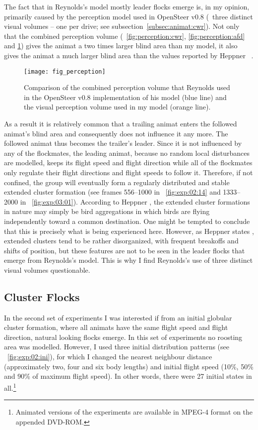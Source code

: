 The fact that in Reynolds's model mostly leader flocks emerge is, in my opinion, primarily caused by the perception model used in OpenSteer v0.8 (\ie\ three distinct visual volumes -- one per drive; see subsection~\ref{subsec:animat:cwr}). Not only that the combined perception volume (\figs~\ref{fig:perception:cwr}, \ref{fig:perception:afd} and \ref{fig:perception}) gives the animat a two times larger blind area than my model, it also gives the animat a much larger blind area than the values reported by Heppner \etal\ \cite{heppner:1985}.
%
\begin{figure}
  \texttt{[image: fig\_perception]}
  \caption{Comparison of the combined perception volume that Reynolds used in the OpenSteer v0.8 implementation of his model \cite{reynolds:1999} (blue line) and the visual perception volume used in my model (orange line).}
  \label{fig:perception}
\end{figure}
%
As a result it is relatively common that a trailing animat enters the followed animat's blind area and consequently does not influence it any more. The followed animat thus becomes the trailer's leader. Since it is not influenced by any of the flockmates, the leading animat, because no random local disturbances are modelled, keeps its flight speed and flight direction while all of the flockmates only regulate their flight directions and flight speeds to follow it. Therefore, if not confined, the group will eventually form a regularly distributed and stable extended cluster formation (see frames 556--1000 in \fig~\ref{fig:exp:02:14} and 1333--2000 in \fig~\ref{fig:exp:03:01}). According to Heppner \cite{heppner:1974a}, the extended cluster formations in nature may simply be bird aggregations in which birds are flying independently toward a common destination. One might be tempted to conclude that this is precisely what is being experienced here. However, as Heppner states \cite{heppner:1974a}, extended clusters tend to be rather disorganized, with frequent breakoffs and shifts of position, but these features are not to be seen in the leader flocks that emerge from Reynolds's model. This is why I find Reynolds's use of three distinct visual volumes questionable.

\subsection{Cluster Flocks}
In the second set of experiments I was interested if from an initial globular cluster formation, where all animats have the same flight speed and flight direction, natural looking flocks emerge. In this set of experiments no roosting area was modelled. However, I used three initial distribution patterns (see \fig~\ref{fig:exp:02:ini}), for which I changed the nearest neighbour distance (approximately two, four and six body lengths) and initial flight speed (10\%, 50\% and 90\% of maximum flight speed). In other words, there were 27 initial states in all.\footnote{Animated versions of the experiments are available in MPEG-4 format on the appended DVD-ROM.}

